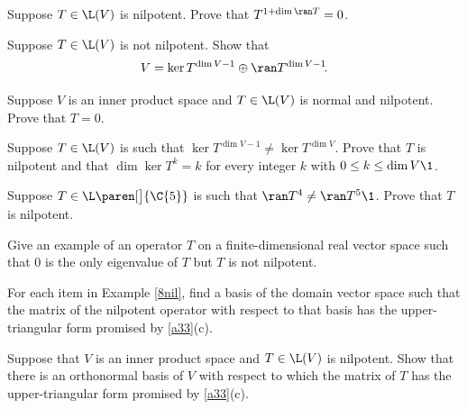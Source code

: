 \exercise
Suppose $T \in \L(V)$ is nilpotent. Prove that $T^{1 + \dim \ran T} = 0$.\label{nilrange}


\exercise
Suppose $T\in \L(V)$ is not nilpotent. Show that\label{8notnil}
\[
V = \ker T^{\dim V-1} \oplus \ran T^{\dim V-1}\!.
\]
\exercisedisplayend
{}


\exercise
Suppose $V$ is an inner product space and $T \in \L(V)$ is normal and nilpotent. Prove that $T = 0$.


\exercise
Suppose $T \in \L(V)$ is such that $\ker T^{\dim V - 1} \ne \ker T^{\dim V}\!$.  Prove that $T$ is nilpotent and that
$
\dim \ker T^k = k$
for every integer $k$ with $0 \le k \le \dim V\1$.\label{8nullTk}


\exercise
Suppose $T \in \L\paren[\big]{\C{5}}$ is such that $\ran T^4 \ne \ran T^5\1$.  Prove that $T$ is
nilpotent.


\exercise
Give an example of an operator $T$ on a finite-dimensional real vector space such that $0$ is the only eigenvalue of $T$ but $T$ is not nilpotent. \label{Nil1}


\exercise
For each item in Example \ref{8nil}, find a basis of the domain vector space such that the matrix of the nilpotent operator with respect to that basis has the upper-triangular form promised by \ref{a33}(c).


\exercise
Suppose that $V$ is an inner product space and $T \in \L(V)$ is nilpotent. Show that there is an orthonormal basis of $V$ with respect to which the matrix of $T$ has the upper-triangular form promised by \ref{a33}(c).



